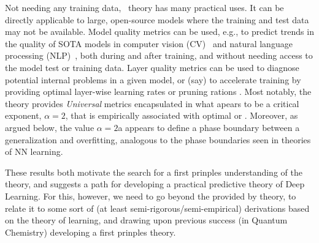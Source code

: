 Not needing any training data, \HTSR~theory has many practical uses.
It can be directly applicable to large, open-source  models where the training and test data may not be available.
Model quality metrics can be used, e.g., to predict trends in the quality of SOTA models in computer vision (CV)~\cite{MM20a_trends_NatComm} and natural language processing (NLP)~\cite{YTHx22_TR,YTHx23_KDD}, both during and after training, and without needing access to the model test or training data.
Layer quality metrics can be used to diagnose potential internal problems in a given model, or (say) to accelerate training by providing optimal layer-wise learning rates \cite{NEURIPS2023_CHM} or pruning rations \cite{alphapruning_NEURIPS2024}.
%
Most notably, the \HTSR theory provides \emph{Universal} \LayerQuality metrics encapsulated in what apears to be a critical exponent, $\alpha=2$, that is empirically associated with optimal or \IdealLearning. Moreover, as argued below, the
value $\alpha=2$a appears to define a phase boundary between a generalization and overfitting, analogous
to the phase boundaries seen in \STATMECH theories of NN learning. 

These results both motivate the search for a first prinples understanding of the \HTSR theory, 
and suggests a path for developing a practical predictive theory of Deep Learning.
For this, however, we need to go beyond the \Phenomenology provided by \HTSR theory, to relate it to some sort of (at least semi-rigorous/semi-empirical) derivations based on the \STATMECH theory of learning, and drawing
upon previous success (in Quantum Chemistry) developing a first prinples \SemiEmpirical theory. 

